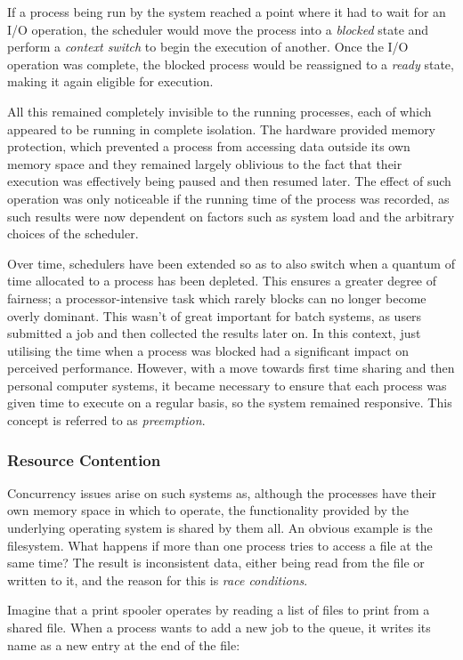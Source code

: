If a process being run by the system reached a point where it had to
wait for an I/O operation, the scheduler would move the process into a
\emph{blocked} state and perform a \emph{context switch} to begin the
execution of another.  Once the I/O operation was complete, the
blocked process would be reassigned to a \emph{ready} state, making it
again eligible for execution.

All this remained completely invisible to the running processes, each
of which appeared to be running in complete isolation.  The hardware
provided memory protection, which prevented a process from accessing
data outside its own memory space and they remained largely oblivious
to the fact that their execution was effectively being paused and then
resumed later.  The effect of such operation was only noticeable if
the running time of the process was recorded, as such results were now
dependent on factors such as system load and the arbitrary choices of
the scheduler.

Over time, schedulers have been extended so as to also switch when a
quantum of time allocated to a process has been depleted.  This
ensures a greater degree of fairness; a processor-intensive task which
rarely blocks can no longer become overly dominant.  This wasn't of
great important for batch systems, as users submitted a job and then
collected the results later on.  In this context, just utilising the
time when a process was blocked had a significant impact on perceived
performance.  However, with a move towards first time sharing and then
personal computer systems, it became necessary to ensure that each
process was given time to execute on a regular basis, so the system
remained responsive.  This concept is referred to as \emph{preemption}.

\subsubsection{Resource Contention}

Concurrency issues arise on such systems as, although the processes
have their own memory space in which to operate, the functionality
provided by the underlying operating system is shared by them all.  An
obvious example is the filesystem.  What happens if more than one
process tries to access a file at the same time?  The result is
inconsistent data, either being read from the file or written to it,
and the reason for this is \emph{race conditions}.

Imagine that a print spooler operates by reading a list of files to
print from a shared file.  When a process wants to add a new job to
the queue, it writes its name as a new entry at the end of the file:

